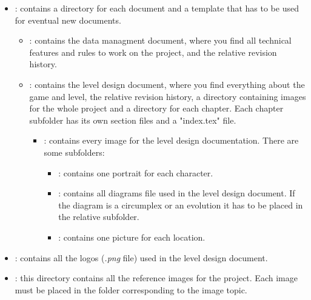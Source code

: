 \begin{itemize}
\item \textbf{}: contains a directory for each document and a template that has to be used for eventual new documents.
  \begin{itemize}
    \item \textbf{}: contains the data managment document, where you find all technical features and rules to work on the project, and the relative revision history.

    \item \textbf{}: contains the level design document, where you find everything about the game and level, the relative revision history, a directory containing images for the whole project and a directory for each chapter. Each chapter subfolder has its own section files and a "index.tex" file.
    \begin{itemize}
    \item \textbf{}: contains every image for the level design documentation. There are some subfolders:
    \begin{itemize}
      \item \textbf{}: contains one portrait for each character.
      \item \textbf{}: contains all diagrams file used in the level design document. If the diagram is a circumplex or an evolution it has to be placed in the relative subfolder.
        \item \textbf{}: contains one picture for each location.
    \end{itemize}
\end{itemize}
\end{itemize}
    \item \textbf{}: contains all the logos (\textit{.png} file) used in the level design document.

    \item \textbf{}: this directory contains all the reference images for the project. Each image must be placed in the folder corresponding to the image topic.

\end{itemize}

